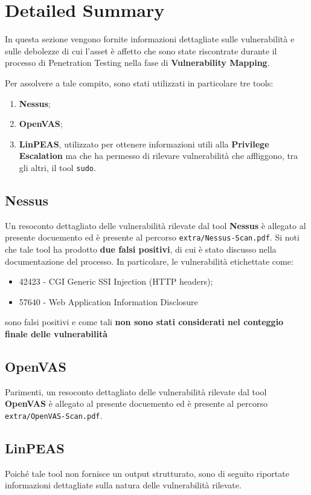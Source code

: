\documentclass[a4paper, 12pt, oneside]{article}
\begin{document}
\section{Detailed Summary}
In questa sezione vengono fornite informazioni dettagliate sulle vulnerabilità e sulle debolezze di cui l'asset è affetto che sono state riscontrate durante il processo di Penetration Testing nella fase di \textbf{Vulnerability Mapping}.

Per assolvere a tale compito, sono stati utilizzati in particolare tre tools:

\begin{enumerate}
    \item \textbf{Nessus};
    \item \textbf{OpenVAS};
    \item \textbf{LinPEAS}, utilizzato per ottenere informazioni utili alla \textbf{Privilege Escalation} ma che ha permesso di rilevare vulnerabilità che affliggono, tra gli altri, il tool \texttt{sudo}.
\end{enumerate}

\subsection{Nessus}
Un resoconto dettagliato delle vulnerabilità rilevate dal tool \textbf{Nessus} è allegato al presente docuemento ed è presente al percorso \texttt{extra/Nessus-Scan.pdf}. Si noti che tale tool ha prodotto \textbf{due falsi positivi}, di cui è stato discusso nella documentazione del processo. In particolare, le vulnerabilità etichettate come:

\begin{itemize}
    \item 42423 - CGI Generic SSI Injection (HTTP headers);
    \item 57640 - Web Application Information Disclosure 
\end{itemize}

sono falsi positivi e come tali \textbf{non sono stati considerati nel conteggio finale delle vulnerabilità}

\subsection{OpenVAS}
Parimenti, un resoconto dettagliato delle vulnerabilità rilevate dal tool \textbf{OpenVAS} è allegato al presente docuemento ed è presente al percorso \texttt{extra/OpenVAS-Scan.pdf}.

\subsection{LinPEAS}
Poiché tale tool non fornisce un output strutturato, sono di seguito riportate informazioni dettagliate sulla natura delle vulnerabilità rilevate.
\end{document}
